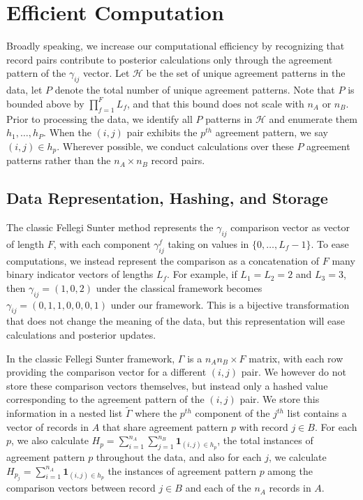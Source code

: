 \documentclass[
  12pt,
]{article}
\begin{document}
\hypertarget{efficient-computation}{%
\section{Efficient Computation}\label{efficient-computation}}

Broadly speaking, we increase our computational efficiency by
recognizing that record pairs contribute to posterior calculations only
through the agreement pattern of the \(\gamma_{ij}\) vector. Let
\(\mathcal{H}\) be the set of unique agreement patterns in the data, let
\(P\) denote the total number of unique agreement patterns. Note that
\(P\) is bounded above by \(\prod_{f=1}^F L_f\), and that this bound
does not scale with \(n_A\) or \(n_B\). Prior to processing the data, we
identify all \(P\) patterns in \(\mathcal{H}\) and enumerate them
\(h_1, \ldots, h_P\). When the \((i,j)\) pair exhibits the \(p^{th}\)
agreement pattern, we say \((i,j) \in h_p\). Wherever possible, we
conduct calculations over these \(P\) agreement patterns rather than the
\(n_A \times n_B\) record pairs.

\hypertarget{data-representation-hashing-and-storage}{%
\subsection{Data Representation, Hashing, and
Storage}\label{data-representation-hashing-and-storage}}

The classic Fellegi Sunter method represents the \(\gamma_{ij}\)
comparison vector as vector of length \(F\), with each component
\(\gamma_{ij}^f\) taking on values in \(\{0, \ldots, L_f - 1\}\). To
ease computations, we instead represent the comparison as a
concatenation of \(F\) many binary indicator vectors of lengths \(L_f\).
For example, if \(L_1 = L_2 = 2\) and \(L_3 = 3\), then
\(\gamma_{ij} = (1, 0, 2)\) under the classical framework becomes
\(\gamma_{ij} = (0, 1, 1, 0, 0, 0, 1)\) under our framework. This is a
bijective transformation that does not change the meaning of the data,
but this representation will ease calculations and posterior updates.

In the classic Fellegi Sunter framework, \(\Gamma\) is a
\(n_A n_B \times F\) matrix, with each row providing the comparison
vector for a different \((i,j)\) pair. We however do not store these
comparison vectors themselves, but instead only a hashed value
corresponding to the agreement pattern of the \((i, j)\) pair. We store
this information in a nested list \(\tilde{\Gamma}\) where the
\(p^{th}\) component of the \(j^{th}\) list contains a vector of records
in \(A\) that share agreement pattern \(p\) with record \(j \in B\). For
each \(p\), we also calculate
\(H_p = \sum_{i=1}^{n_A}\sum_{j=1}^{n_B} \mathbf{1}_{(i,j) \in h_p}\),
the total instances of agreement pattern \(p\) throughout the data, and
also for each \(j\), we calculate
\(H_{p_j} = \sum_{i=1}^{n_A} \mathbf{1}_{{(i,j) \in h_p}}\) the
instances of agreement pattern \(p\) among the comparison vectors
between record \(j \in B\) and each of the \(n_A\) records in \(A\).
\end{document}
